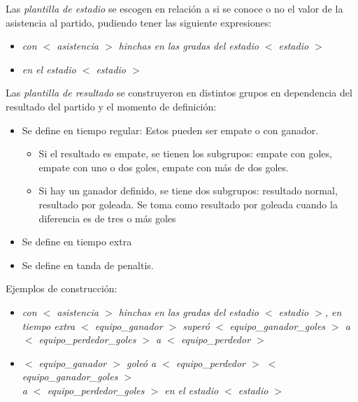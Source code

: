Las \textit{plantilla de estadio} se escogen en relación a si se conoce o no el valor de la asistencia al partido, pudiendo tener las siguiente expresiones:
    \begin{itemize}
        \item \textit{con  $<$ asistencia $>$ hinchas en las gradas del estadio $<$ estadio $>$}
        \item \textit{en el estadio $<$ estadio $>$}
    \end{itemize}

Las \textit{plantilla de resultado} se construyeron en distintos grupos en dependencia del resultado del partido y el momento de definición:
    \begin{itemize}
        \item Se define en tiempo regular: Estos pueden ser empate o con ganador. 
                    \begin{itemize}
                        \item Si el resultado es empate, se tienen los subgrupos: empate con goles, 
                        empate con uno o dos goles, empate con más de dos goles. 
                        \item  Si hay un ganador definido, se tiene dos subgrupos: resultado normal, 
                        resultado por goleada. Se toma como resultado por goleada cuando la diferencia es de tres o más goles
                    \end{itemize}
        \item Se define en tiempo extra
        \item Se define en tanda de penaltis.
    \end{itemize}

    Ejemplos de construcción:\\

        \begin{itemize}
           \item  \textit{ con  $<$ asistencia $>$ hinchas en las gradas del estadio $<$ estadio $>$, en tiempo extra $<$ equipo\_ganador $>$ superó $<$ equipo\_ganador\_goles $>$ a \\$<$ equipo\_perdedor\_goles $>$ a $<$ equipo\_perdedor $>$ }
        
            \item  \textit{$<$ equipo\_ganador $>$ goleó a $<$ equipo\_perdedor $>$ $<$ equipo\_ganador\_goles $>$ \\a $<$ equipo\_perdedor\_goles $>$ en el estadio $<$ estadio $>$}
        \end{itemize}


